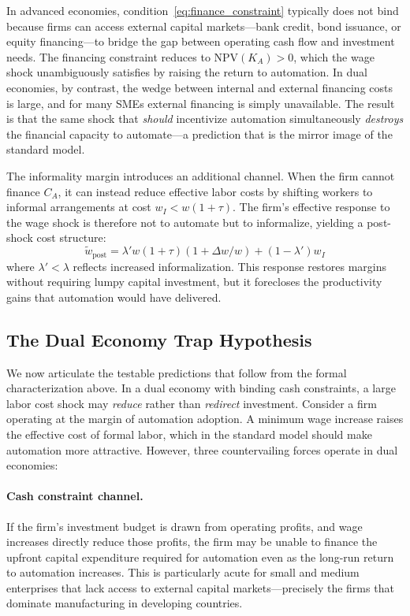 \documentclass[5p,times,authoryear]{elsarticle}
\begin{document}
In advanced economies, condition~\eqref{eq:finance_constraint} typically does not bind because firms can access external capital markets---bank credit, bond issuance, or equity financing---to bridge the gap between operating cash flow and investment needs. The financing constraint reduces to $\text{NPV}(K_A) > 0$, which the wage shock unambiguously satisfies by raising the return to automation. In dual economies, by contrast, the wedge between internal and external financing costs is large, and for many SMEs external financing is simply unavailable. The result is that the same shock that \emph{should} incentivize automation simultaneously \emph{destroys} the financial capacity to automate---a prediction that is the mirror image of the standard model.

The informality margin introduces an additional channel. When the firm cannot finance $C_A$, it can instead reduce effective labor costs by shifting workers to informal arrangements at cost $w_I < w(1+\tau)$. The firm's effective response to the wage shock is therefore not to automate but to informalize, yielding a post-shock cost structure:
\begin{equation}
\label{eq:informalize}
\tilde{w}_{\text{post}} = \lambda' w(1+\tau)(1 + \Delta w/w) + (1-\lambda') w_I
\end{equation}
where $\lambda' < \lambda$ reflects increased informalization. This response restores margins without requiring lumpy capital investment, but it forecloses the productivity gains that automation would have delivered.

\subsection{The Dual Economy Trap Hypothesis}
\label{subsec:trap_hypothesis}

We now articulate the testable predictions that follow from the formal characterization above. In a dual economy with binding cash constraints, a large labor cost shock may \emph{reduce} rather than \emph{redirect} investment. Consider a firm operating at the margin of automation adoption. A minimum wage increase raises the effective cost of formal labor, which in the standard model should make automation more attractive. However, three countervailing forces operate in dual economies:

\paragraph{Cash constraint channel.} If the firm's investment budget is drawn from operating profits, and wage increases directly reduce those profits, the firm may be unable to finance the upfront capital expenditure required for automation even as the long-run return to automation increases. This is particularly acute for small and medium enterprises that lack access to external capital markets---precisely the firms that dominate manufacturing in developing countries.
\end{document}
